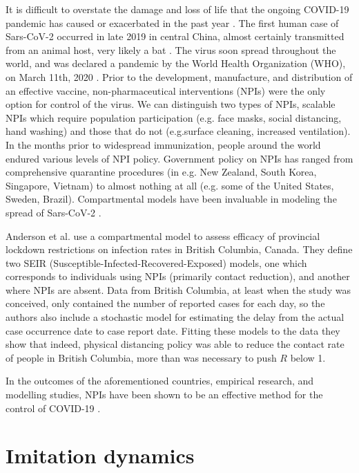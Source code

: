 It is difficult to overstate the damage and loss of life that the ongoing COVID-19 pandemic has caused or exacerbated in the past year \cite{miller2020disease,who2021impact}. The first human case of Sars-CoV-2 occurred in late 2019 in central China, almost certainly transmitted from an animal host, very likely a bat \cite{andersen2020proximal,rasmussen2021origins,zhu2020novel}. The virus soon spread throughout the world, and was declared a pandemic by the World Health Organization (WHO), on March 11th, 2020 \cite{who2020announces}. Prior to the development, manufacture, and distribution of an effective vaccine, non-pharmaceutical interventions (NPIs) were the only option for control of the virus. We can distinguish two types of NPIs, scalable NPIs which require population participation (e.g. face masks, social distancing, hand washing) and those that do not (e.g.surface cleaning, increased ventilation). In the months prior to widespread immunization, people around the world endured various levels of NPI policy. Government policy on NPIs has ranged from comprehensive quarantine procedures (in e.g. New Zealand, South Korea, Singapore, Vietnam) to almost nothing at all (e.g. some of the United States, Sweden, Brazil). 
Compartmental models have been invaluable in modeling the spread of Sars-CoV-2 \cite{thompson2020epidemiological}.


Anderson et al. \cite{anderson2020estimating} use a compartmental model to assess efficacy of provincial lockdown restrictions on infection rates in British Columbia, Canada. They define two SEIR (Susceptible-Infected-Recovered-Exposed) models, one which corresponds to individuals using NPIs (primarily contact reduction), and another where NPIs are absent. Data from British Columbia, at least when the study was conceived, only contained the number of reported cases for each day, so the authors also include a stochastic model for estimating the delay from the actual case occurrence date to case report date. Fitting these models to the data they show that indeed, physical distancing policy was able to reduce the contact rate of people in British Columbia, more than was necessary to push $R$ below 1. 


In the outcomes of the aforementioned countries, empirical research, and modelling studies, NPIs have been shown to be an effective method for the control of COVID-19 \cite{flaxman2020estimating,ferguson2020report,demirguc2020sooner}. 

\section{Imitation dynamics}

